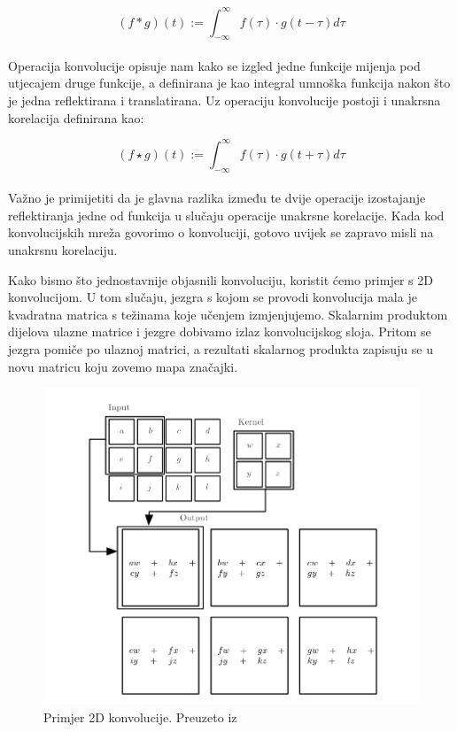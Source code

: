 \documentclass[times, utf8, zavrsni, numeric]{fer}
\begin{document}
\begin{equation}
    (f * g)(t) := \int_{-\infty}^{\infty}f(\tau) \cdot g(t-\tau)d\tau
    \label{eq:convolution}
\end{equation}
\\
Operacija konvolucije opisuje nam kako se izgled jedne funkcije mijenja pod utjecajem druge funkcije, 
a definirana je kao integral umnoška funkcija nakon što je jedna reflektirana i translatirana. 
Uz operaciju konvolucije postoji i unakrsna korelacija definirana kao:

\begin{equation}
    (f \star g)(t) := \int_{-\infty}^{\infty}f(\tau) \cdot g(t+\tau)d\tau
    \label{eq:convolution}
\end{equation}
\\
Važno je primijetiti da je glavna razlika između te dvije operacije izostajanje reflektiranja jedne od funkcija u slučaju operacije unakrsne korelacije. 
Kada kod konvolucijskih mreža govorimo o konvoluciji, gotovo uvijek se zapravo misli na unakrsnu korelaciju.

Kako bismo što jednostavnije objasnili konvoluciju, koristit ćemo primjer s 2D konvolucijom.
U tom slučaju, jezgra s kojom se provodi konvolucija mala je kvadratna matrica s težinama koje učenjem izmjenjujemo. Skalarnim produktom dijelova ulazne matrice i jezgre dobivamo izlaz konvolucijskog sloja.
Pritom se jezgra pomiče po ulaznoj matrici, a rezultati skalarnog produkta zapisuju se u novu matricu koju zovemo mapa značajki.

\pagebreak
\begin{figure}[htb]
    \centering
    \includegraphics[scale=0.5]{convolution.png}
    \caption{Primjer 2D konvolucije. Preuzeto iz \cite{Goodfellow-et-al-2016}}
    \label{fig:convolution}
\end{figure}
\end{document}

